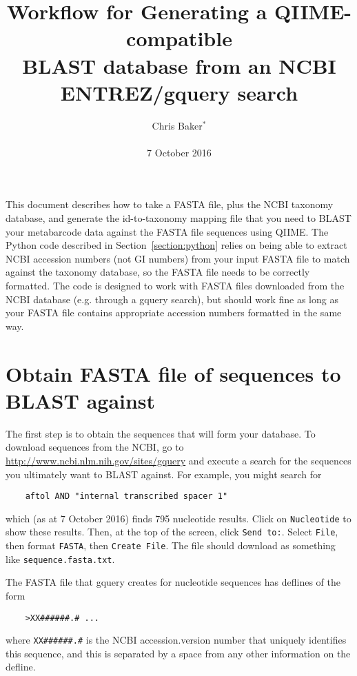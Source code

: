 \documentclass[11pt]{amsart}
\title{Workflow for Generating a QIIME-compatible\\BLAST database from an NCBI ENTREZ/gquery search}
\author{Chris Baker$^*$\\ \\7 October 2016}
\begin{document}
\maketitle

\thispagestyle{fancy}

This document describes how to take a FASTA file, plus the NCBI taxonomy database, and generate the id-to-taxonomy mapping file that you need to BLAST your metabarcode data against the FASTA file sequences using QIIME. The Python code described in Section~\ref{section:python} relies on being able to extract NCBI accession numbers (not GI numbers) from your input FASTA file to match against the taxonomy database, so the FASTA file needs to be correctly formatted. The code is designed to work with FASTA files downloaded from the NCBI database (e.g. through a gquery search), but should work fine as long as your FASTA file contains appropriate accession numbers formatted in the same way.

\section{Obtain FASTA file of sequences to BLAST against}
\label{section:gquery}

The first step is to obtain the sequences that will form your database. To download sequences from the NCBI, go to \url{http://www.ncbi.nlm.nih.gov/sites/gquery} and execute a search for the sequences you ultimately want to BLAST against. For example, you might search for

\begin{verbatim}
    aftol AND "internal transcribed spacer 1"
\end{verbatim}

which (as at 7 October 2016) finds 795 nucleotide results. Click on \verb|Nucleotide| to show these results. Then, at the top of the screen, click \verb|Send to:|. Select \verb|File|, then format \verb|FASTA|, then \verb|Create File|. The file should download as something like \verb|sequence.fasta.txt|.

The FASTA file that gquery creates for nucleotide sequences has deflines of the form

\begin{verbatim}
    >XX######.# ...
\end{verbatim}

where \verb|XX######.#| is the NCBI accession.version number that uniquely identifies this sequence, and this is separated by a space from any other information on the defline.
\end{document}

